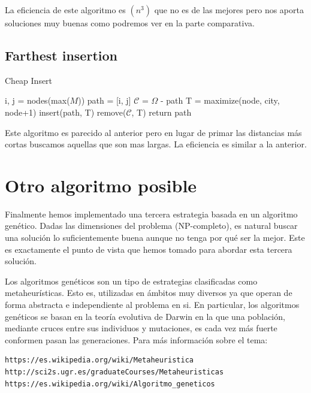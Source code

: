 \documentclass{article}
\begin{document}
La eficiencia de este algoritmo es $(n^3)$ que no es de las mejores
pero nos aporta soluciones muy buenas como podremos ver en la parte
comparativa.

\subsection{Farthest insertion}

\begin{algorithm}[H]
\caption{Cheap Insert}
\begin{algorithmic}
\State i, j = nodes(max($M$))
\State path = [i, j]
\State $\mathcal{C}$ = $\Omega$ - path
\State T = maximize(node, city, node+1)
\EndFor
\State insert(path, T)
\State remove($\mathcal{C}$, T)
\EndIf
\EndFor
\EndWhile
\State return path
\end{algorithmic}
\end{algorithm}

Este algoritmo es parecido al anterior pero en lugar de primar las
distancias más cortas buscamos aquellas que son mas largas. La
eficiencia es similar a la anterior.

\section{Otro algoritmo posible}

Finalmente hemos implementado una tercera estrategia basada en un
algoritmo genético. Dadas las dimensiones del problema (NP-completo),
es natural buscar una solución lo suficientemente buena aunque no
tenga por qué ser la mejor. Este es exactamente el punto de vista que
hemos tomado para abordar esta tercera solución.

Los algoritmos genéticos son un tipo de estrategias clasificadas como
metaheurísticas. Esto es, utilizadas en ámbitos muy diversos ya que
operan de forma abstracta e independiente al problema en si. En
particular, los algoritmos genéticos se basan en la teoría evolutiva
de Darwin en la que una población, mediante cruces entre sus
individuos y mutaciones, es cada vez más fuerte conformen pasan las
generaciones. Para más información sobre el tema:

\begin{verbatim}
https://es.wikipedia.org/wiki/Metaheuristica
http://sci2s.ugr.es/graduateCourses/Metaheuristicas
https://es.wikipedia.org/wiki/Algoritmo_geneticos
\end{verbatim}
\end{document}
